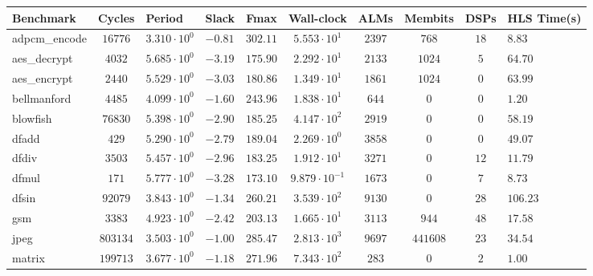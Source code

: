 \begin{tabular}{|l|c|HHc|c|c|c|cH|}
\hline
Benchmark     & Cycles       & Period                 & Slack     & Fmax       & Wall-clock              & ALMs      & Membits    & DSPs    & HLS Time(s) \\
\hline
adpcm\_encode & $ 16776    $ & $ 3.310 \cdot 10^{0} $ & $ -0.81 $ & $ 302.11 $ & $ 5.553 \cdot 10^{1}  $ & $ 2397  $ & $ 768    $ & $ 18  $ & $ 8.83    $ \\
aes\_decrypt  & $ 4032     $ & $ 5.685 \cdot 10^{0} $ & $ -3.19 $ & $ 175.90 $ & $ 2.292 \cdot 10^{1}  $ & $ 2133  $ & $ 1024   $ & $ 5   $ & $ 64.70   $ \\
aes\_encrypt  & $ 2440     $ & $ 5.529 \cdot 10^{0} $ & $ -3.03 $ & $ 180.86 $ & $ 1.349 \cdot 10^{1}  $ & $ 1861  $ & $ 1024   $ & $ 0   $ & $ 63.99   $ \\
bellmanford   & $ 4485     $ & $ 4.099 \cdot 10^{0} $ & $ -1.60 $ & $ 243.96 $ & $ 1.838 \cdot 10^{1}  $ & $ 644   $ & $ 0      $ & $ 0   $ & $ 1.20    $ \\
blowfish      & $ 76830    $ & $ 5.398 \cdot 10^{0} $ & $ -2.90 $ & $ 185.25 $ & $ 4.147 \cdot 10^{2}  $ & $ 2919  $ & $ 0      $ & $ 0   $ & $ 58.19   $ \\
dfadd         & $ 429      $ & $ 5.290 \cdot 10^{0} $ & $ -2.79 $ & $ 189.04 $ & $ 2.269 \cdot 10^{0}  $ & $ 3858  $ & $ 0      $ & $ 0   $ & $ 49.07   $ \\
dfdiv         & $ 3503     $ & $ 5.457 \cdot 10^{0} $ & $ -2.96 $ & $ 183.25 $ & $ 1.912 \cdot 10^{1}  $ & $ 3271  $ & $ 0      $ & $ 12  $ & $ 11.79   $ \\
dfmul         & $ 171      $ & $ 5.777 \cdot 10^{0} $ & $ -3.28 $ & $ 173.10 $ & $ 9.879 \cdot 10^{-1} $ & $ 1673  $ & $ 0      $ & $ 7   $ & $ 8.73    $ \\
dfsin         & $ 92079    $ & $ 3.843 \cdot 10^{0} $ & $ -1.34 $ & $ 260.21 $ & $ 3.539 \cdot 10^{2}  $ & $ 9130  $ & $ 0      $ & $ 28  $ & $ 106.23  $ \\
gsm           & $ 3383     $ & $ 4.923 \cdot 10^{0} $ & $ -2.42 $ & $ 203.13 $ & $ 1.665 \cdot 10^{1}  $ & $ 3113  $ & $ 944    $ & $ 48  $ & $ 17.58   $ \\
jpeg          & $ 803134   $ & $ 3.503 \cdot 10^{0} $ & $ -1.00 $ & $ 285.47 $ & $ 2.813 \cdot 10^{3}  $ & $ 9697  $ & $ 441608 $ & $ 23  $ & $ 34.54   $ \\
matrix        & $ 199713   $ & $ 3.677 \cdot 10^{0} $ & $ -1.18 $ & $ 271.96 $ & $ 7.343 \cdot 10^{2}  $ & $ 283   $ & $ 0      $ & $ 2   $ & $ 1.00    $ \\

\end{tabular}
